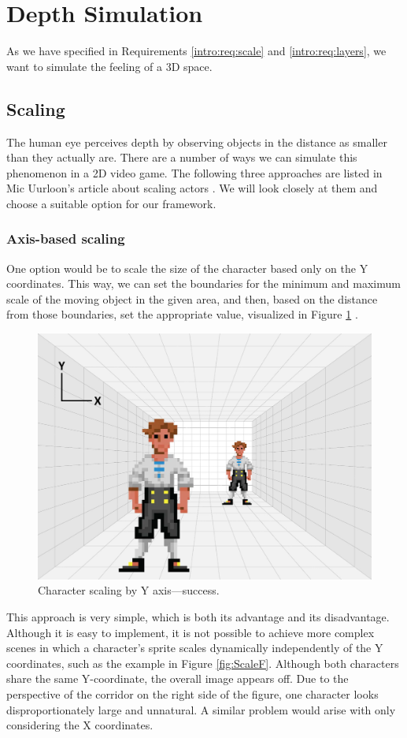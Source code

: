 \section{Depth Simulation}
As we have specified in Requirements \ref{intro:req:scale} and \ref{intro:req:layers}, we want to simulate the feeling of a 3D space. 

\subsection{Scaling}
\label{analysis:depth:scaling}
The human eye perceives depth by observing objects in the distance as smaller than they actually are. There are a number of ways we can simulate this phenomenon in a 2D video game. The following three approaches are listed in Mic Uurloon's article about scaling actors \cite{Uurloon3}. We will look closely at them and choose a suitable option for our framework.

\subsubsection{Axis-based scaling}
One option would be to scale the size of the character based only on the Y coordinates. This way, we can set the boundaries for the minimum and maximum scale of the moving object in the given area, and then, based on the distance from those boundaries, set the appropriate value, visualized in Figure \ref{fig:Room} . 

\begin{figure}[H]
\centering
\includegraphics[width=.5\linewidth]{img/room2.png}
\caption{Character scaling by Y axis—success.}
\label{fig:Room}
\end{figure}

This approach is very simple, which is both its advantage and its disadvantage. Although it is easy to implement, it is not possible to achieve more complex scenes in which a character's sprite scales dynamically independently of the Y coordinates, such as the example in Figure \ref{fig:ScaleF}. Although both characters share the same Y-coordinate, the overall image appears off. Due to the perspective of the corridor on the right side of the figure, one character looks disproportionately large and unnatural.  A similar problem would arise with only considering the X coordinates.

